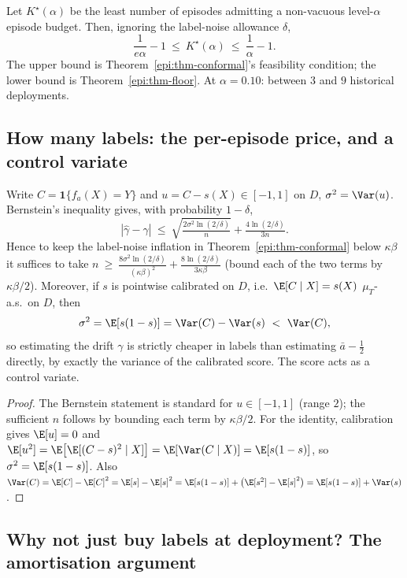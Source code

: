 \begin{corollary}[Bracket]\label{epi:cor-bracket}
Let $K^\star(\alpha)$ be the least number of episodes admitting a non-vacuous level-$\alpha$
episode budget. Then, ignoring the label-noise allowance $\delta$,
\[
\frac1{e\alpha}-1\ \le\ K^\star(\alpha)\ \le\ \frac1\alpha-1 .
\]
The upper bound is Theorem~\ref{epi:thm-conformal}'s feasibility condition; the lower bound is
Theorem~\ref{epi:thm-floor}. At $\alpha=0.10$: between $3$ and $9$ historical deployments.
\end{corollary}

\subsection{How many labels: the per-episode price, and a control variate}

\begin{proposition}\label{epi:prop-labels}
Write $C=\mathbf 1\{f_a(X)=Y\}$ and $u=C-s(X)\in[-1,1]$ on $D$, $\sigma^2=\Var(u)$. Bernstein's
inequality gives, with probability $1-\delta$,
\[
|\widehat\gamma-\gamma|\ \le\ \sqrt{\tfrac{2\sigma^2\ln(2/\delta)}{n}}+\tfrac{4\ln(2/\delta)}{3n}.
\]
Hence to keep the label-noise inflation in Theorem~\ref{epi:thm-conformal} below $\kappa\beta$ it
suffices to take
$n\ \ge\ \tfrac{8\sigma^2\ln(2/\delta)}{(\kappa\beta)^2}+\tfrac{8\ln(2/\delta)}{3\kappa\beta}$
(bound each of the two terms by $\kappa\beta/2$).
Moreover, if $s$ is pointwise calibrated on $D$, i.e.\ $\E[C\mid X]=s(X)$ $\mu_T$-a.s.\ on $D$, then
\[
\sigma^2=\E[s(1-s)]=\Var(C)-\Var(s)\ <\ \Var(C),
\]
so estimating the drift $\gamma$ is strictly cheaper in labels than estimating $\bar a-\tfrac12$
directly, by exactly the variance of the calibrated score. The score acts as a control variate.
\end{proposition}

\begin{proof}
The Bernstein statement is standard for $u\in[-1,1]$ (range $2$); the sufficient $n$ follows by
bounding each term by $\kappa\beta/2$. For the identity, calibration gives $\E[u]=0$ and
$\E[u^2]=\E\bigl[\E[(C-s)^2\mid X]\bigr]=\E[\Var(C\mid X)]=\E[s(1-s)]$, so $\sigma^2=\E[s(1-s)]$.
Also $\Var(C)=\E[C]-\E[C]^2=\E[s]-\E[s]^2=\E[s(1-s)]+\bigl(\E[s^2]-\E[s]^2\bigr)
=\E[s(1-s)]+\Var(s)$.
\end{proof}

\subsection{Why not just buy labels at deployment? The amortisation argument}

